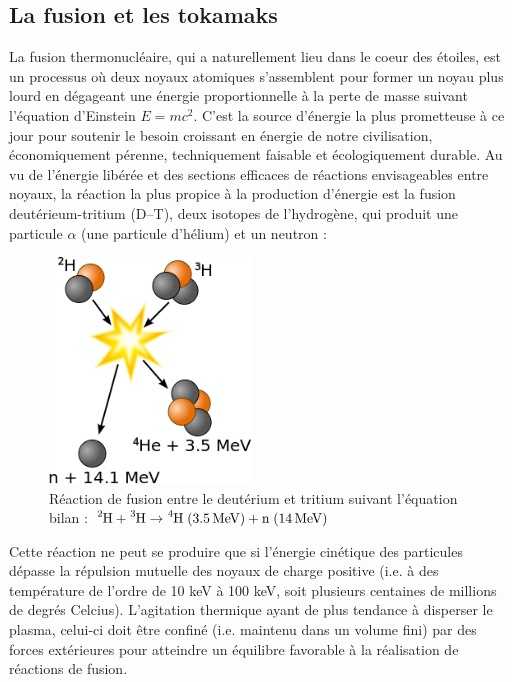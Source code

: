 \label{AnnexeA}
\begin{refsection}

\section*{La fusion et les tokamaks}

La fusion thermonucléaire, qui a naturellement lieu dans le coeur des étoiles,
est un processus où deux noyaux atomiques s'assemblent pour former un noyau
plus lourd en dégageant une énergie proportionnelle à la perte de masse suivant
l'équation d'Einstein $E=mc^2$. C'est la source d'énergie la plus prometteuse
à ce jour pour soutenir le besoin croissant en énergie de notre civilisation,
économiquement pérenne, techniquement faisable et écologiquement durable.
Au vu de l'énergie libérée et des sections efficaces de réactions envisageables
entre noyaux, la réaction la plus propice à la production d'énergie est la
fusion deutérieum-tritium (D--T), deux isotopes de l'hydrogène, qui produit une
particule $\alpha$ (une particule d'hélium) et un neutron :
\begin{figure}[!htbp]
    \centering
	\includegraphics[height=60mm]{figures/1-fusion.png}
	\caption{Réaction
de fusion entre le deutérium et tritium suivant l'équation
bilan : $\ce{^2\text{H}}+\ce{^3\text{H}} \rightarrow
\ce{^4\text{H}}\;(3.5\,\text{MeV})+\text{n}\;(14\,\text{MeV})$}\label{fusionDT}
\end{figure}

Cette réaction ne peut se produire que si l'énergie cinétique des particules
dépasse la répulsion mutuelle des noyaux de charge positive (i.e. à des
température de l'ordre de 10 keV à 100 keV, soit plusieurs centaines de
millions de degrés Celcius). L'agitation thermique ayant de plus tendance à
disperser le plasma, celui-ci doit être confiné (i.e. maintenu dans un volume
fini) par des forces extérieures pour atteindre un équilibre favorable à la
réalisation de réactions de fusion.


\end{refsection}
